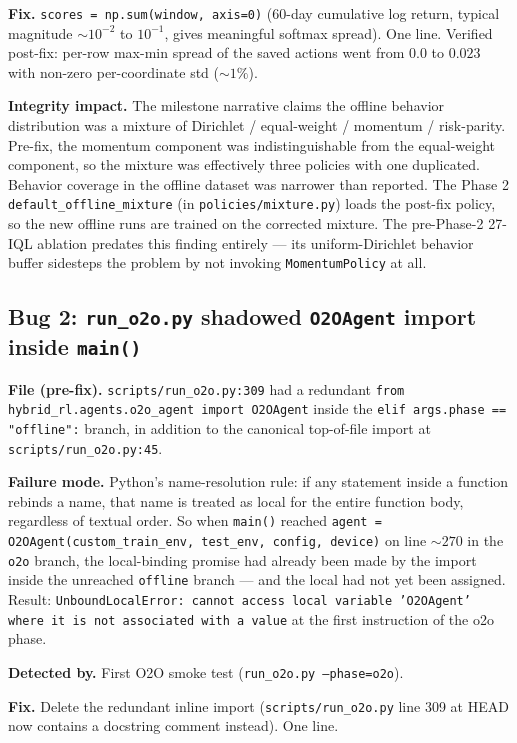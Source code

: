 \textbf{Fix.} \texttt{scores = np.sum(window, axis=0)} (60-day cumulative
log return, typical magnitude $\sim\!10^{-2}$ to $10^{-1}$, gives
meaningful softmax spread). One line. Verified post-fix: per-row
max-min spread of the saved actions went from $0.0$ to $0.023$ with
non-zero per-coordinate std ($\sim\!1\%$).

\textbf{Integrity impact.} The milestone narrative claims the offline
behavior distribution was a mixture of Dirichlet / equal-weight /
momentum / risk-parity. Pre-fix, the momentum component was
indistinguishable from the equal-weight component, so the mixture was
effectively three policies with one duplicated. Behavior coverage in
the offline dataset was narrower than reported. The Phase 2
\texttt{default\_offline\_mixture} (in \texttt{policies/mixture.py})
loads the post-fix policy, so the new offline runs are trained on the
corrected mixture. The pre-Phase-2 27-IQL ablation predates this
finding entirely --- its uniform-Dirichlet behavior buffer sidesteps
the problem by not invoking \texttt{MomentumPolicy} at all.

\subsection{Bug 2: \texttt{run\_o2o.py} shadowed \texttt{O2OAgent}
import inside \texttt{main()}}
\label{app:impl:shadow-import}

\textbf{File (pre-fix).} \texttt{scripts/run\_o2o.py:309} had a
redundant \texttt{from hybrid\_rl.agents.o2o\_agent import O2OAgent}
inside the \texttt{elif args.phase == "offline":} branch, in addition
to the canonical top-of-file import at \texttt{scripts/run\_o2o.py:45}.

\textbf{Failure mode.} Python's name-resolution rule: if any statement
inside a function rebinds a name, that name is treated as local for the
entire function body, regardless of textual order. So when
\texttt{main()} reached
\texttt{agent = O2OAgent(custom\_train\_env, test\_env, config, device)}
on line $\sim 270$ in the \texttt{o2o} branch, the local-binding
promise had already been made by the import inside the unreached
\texttt{offline} branch --- and the local had not yet been assigned.
Result: \texttt{UnboundLocalError: cannot access local variable
'O2OAgent' where it is not associated with a value} at the first
instruction of the o2o phase.

\textbf{Detected by.} First O2O smoke test
(\texttt{run\_o2o.py --phase=o2o}).

\textbf{Fix.} Delete the redundant inline import
(\texttt{scripts/run\_o2o.py} line 309 at HEAD now contains a docstring
comment instead). One line.


